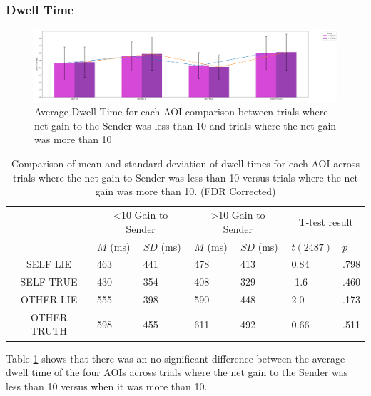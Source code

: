 \documentclass[man, floatsintext]{apa7}
\begin{document}
\subsubsection{Dwell Time}

\begin{figure}[H]
	\centering
	\includegraphics[width=\linewidth]{../plots/RESPONSE/AvgDwellPerGain.png}
	\caption{Average Dwell Time for each AOI comparison between trials where net gain to the Sender was less than 10 and trials where the net gain was more than 10}
	\label{fig:AvgDwellPerGain}
\end{figure}

\begin{table}[H]
	\centering
	\begin{tabular}{|c|p{1.5cm}|p{2cm}|p{1.5cm}|p{2cm}|p{2cm}|p{1.5cm}|}
		\hline
		\multirow{2}{*}{} & \multicolumn{2}{c|}{<10 Gain to Sender} & \multicolumn{2}{c|}{>10 Gain to Sender} & \multicolumn{2}{c|}{T-test result} \\ \cline{2-7}
		& $M$ (ms) &$SD$ (ms) & $M$ (ms) & $SD$ (ms) & $t(2487)$ & $p$ \\ \hline
		SELF LIE& 463 & 441 & 478 & 413 & 0.84 & .798  \\ \hline
		SELF TRUE & 430 & 354 & 408 & 329 & -1.6 & .460  \\ \hline
		OTHER LIE & 555 & 398 & 590 & 448 & 2.0 & .173 \\ \hline
		OTHER TRUTH & 598 & 455 & 611 & 492 & 0.66 & .511 \\ \hline
	\end{tabular}
	\vspace{0.3cm}
	\caption{Comparison of mean and standard deviation of dwell times for each AOI across trials where the net gain to Sender was less than 10 versus trials where the net gain was more than 10. (FDR Corrected)}
	\label{tab:NetGainDwell}
\end{table}


Table \ref{tab:NetGainDwell} shows that there was an no significant difference between the average dwell time of the four AOIs across trials where the net gain to the Sender was less than 10 versus when it was more than 10.
\end{document}
